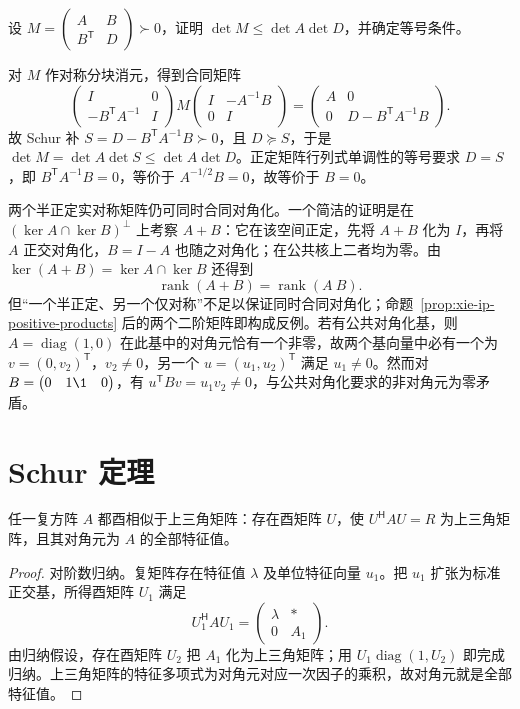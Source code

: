 \begin{example}
设 $M=\begin{pmatrix}A&B\\B^{\mathsf T}&D\end{pmatrix}\succ0$，证明 $\det M\leq\det A\det D$，并确定等号条件。
\end{example}
\begin{solve}
对 $M$ 作对称分块消元，得到合同矩阵
\[
\begin{pmatrix}I&0\\-B^{\mathsf T}A^{-1}&I\end{pmatrix}
M
\begin{pmatrix}I&-A^{-1}B\\0&I\end{pmatrix}
=\begin{pmatrix}A&0\\0&D-B^{\mathsf T}A^{-1}B\end{pmatrix}.
\]
故 Schur 补 $S=D-B^{\mathsf T}A^{-1}B\succ0$，且 $D\succeq S$，于是 $\det M=\det A\det S\leq\det A\det D$。正定矩阵行列式单调性的等号要求 $D=S$，即 $B^{\mathsf T}A^{-1}B=0$，等价于 $A^{-1/2}B=0$，故等价于 $B=0$。
\end{solve}

两个半正定实对称矩阵仍可同时合同对角化。一个简洁的证明是在 $(\ker A\cap\ker B)^\perp$ 上考察 $A+B$：它在该空间正定，先将 $A+B$ 化为 $I$，再将 $A$ 正交对角化，$B=I-A$ 也随之对角化；在公共核上二者均为零。由 $\ker(A+B)=\ker A\cap\ker B$ 还得到
\[
\operatorname{rank}(A+B)=\operatorname{rank}(A\ B).
\]
但“一个半正定、另一个仅对称”不足以保证同时合同对角化；命题~\ref{prop:xie-ip-positive-products} 后的两个二阶矩阵即构成反例。若有公共对角化基，则 $A=\operatorname{diag}(1,0)$ 在此基中的对角元恰有一个非零，故两个基向量中必有一个为 $v=(0,v_2)^{\mathsf T}$，$v_2\ne0$，另一个 $u=(u_1,u_2)^{\mathsf T}$ 满足 $u_1\ne0$。然而对 $B=\begin{pmatrix}0&1\1&0\end{pmatrix}$，有 $u^{\mathsf T}Bv=u_1v_2\ne0$，与公共对角化要求的非对角元为零矛盾。

\section{Schur 定理}
\label{sec:xie-ip-schur}

\begin{theorem}
\label{thm:xie-ip-schur}
任一复方阵 $A$ 都酉相似于上三角矩阵：存在酉矩阵 $U$，使 $U^{\mathsf H}AU=R$ 为上三角矩阵，且其对角元为 $A$ 的全部特征值。
\end{theorem}
\begin{proof}
对阶数归纳。复矩阵存在特征值 $\lambda$ 及单位特征向量 $u_1$。把 $u_1$ 扩张为标准正交基，所得酉矩阵 $U_1$ 满足
\[
U_1^{\mathsf H}AU_1=\begin{pmatrix}\lambda&*\\0&A_1\end{pmatrix}.
\]
由归纳假设，存在酉矩阵 $U_2$ 把 $A_1$ 化为上三角矩阵；用 $U_1\operatorname{diag}(1,U_2)$ 即完成归纳。上三角矩阵的特征多项式为对角元对应一次因子的乘积，故对角元就是全部特征值。
\end{proof}

